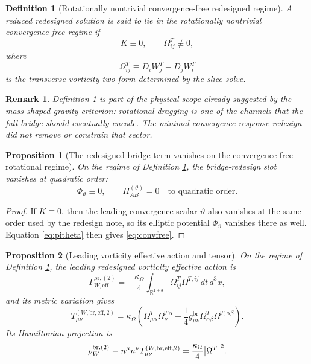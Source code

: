\documentclass[11pt]{article}
\newcommand{\PiTheta}{\Pi^{(\vartheta)}}
\newtheorem{definition}{Definition}
\newtheorem{proposition}{Proposition}
\newtheorem{remark}{Remark}
\begin{document}
\begin{definition}[Rotationally nontrivial convergence-free redesigned regime]
\label{def:rot}
A reduced redesigned solution is said to lie in the \emph{rotationally nontrivial convergence-free regime} if
\begin{equation}
K\equiv 0,
\qquad
\Omega_{ij}^T\not\equiv 0,
\label{eq:rot}
\end{equation}
where
\[
\Omega_{ij}^T\equiv D_iW_j^T-D_jW_i^T
\]
is the transverse-vorticity two-form determined by the slice solve.
\end{definition}

\begin{remark}
Definition \ref{def:rot} is part of the physical scope already suggested by the mass-shaped gravity criterion: rotational dragging is one of the channels that the full bridge should eventually encode. The minimal convergence-response redesign did not remove or constrain that sector.
\end{remark}

\begin{proposition}[The redesigned bridge term vanishes on the convergence-free rotational regime]
\label{prop:convfree}
On the regime of Definition \ref{def:rot}, the bridge-redesign slot vanishes at quadratic order:
\begin{equation}
\Phi_\vartheta\equiv 0,
\qquad
\PiTheta_{AB}=0
\quad\text{to quadratic order}.
\label{eq:convfree}
\end{equation}
\end{proposition}

\begin{proof}
If \(K\equiv0\), then the leading convergence scalar \(\vartheta\) also vanishes at the same order used by the redesign note, so its elliptic potential \(\Phi_\vartheta\) vanishes there as well. Equation \eqref{eq:pitheta} then gives \eqref{eq:convfree}.
\end{proof}

\begin{proposition}[Leading vorticity effective action and tensor]
\label{prop:W}
On the regime of Definition \ref{def:rot}, the leading redesigned vorticity effective action is
\begin{equation}
\Gamma_{W,\mathrm{eff}}^{\mathrm{br},(2)}
=
-\frac{\kappa_\Omega}{4}
\int_{\mathbb R^{1+3}}\Omega_{ij}^T\Omega^{T,ij}\,dt\,d^3x,
\label{eq:GammaW}
\end{equation}
and its metric variation gives
\begin{equation}
T_{\mu\nu}^{(W,\mathrm{br,eff},2)}
=
\kappa_\Omega
\left(
\Omega_{\mu\alpha}^T\Omega_\nu^{T\,\alpha}
-\frac14 g_{\mu\nu}^{\mathrm{br}}\Omega_{\alpha\beta}^T\Omega^{T,\alpha\beta}
\right).
\label{eq:TW}
\end{equation}
Its Hamiltonian projection is
\begin{equation}
\rho_W^{\mathrm{br},(2)}
\equiv
n^\mu n^\nu T_{\mu\nu}^{(W,\mathrm{br,eff},2)}
=
\frac{\kappa_\Omega}{4}\abs{\Omega^T}^2.
\label{eq:rhoW}
\end{equation}
\end{proposition}
\end{document}
